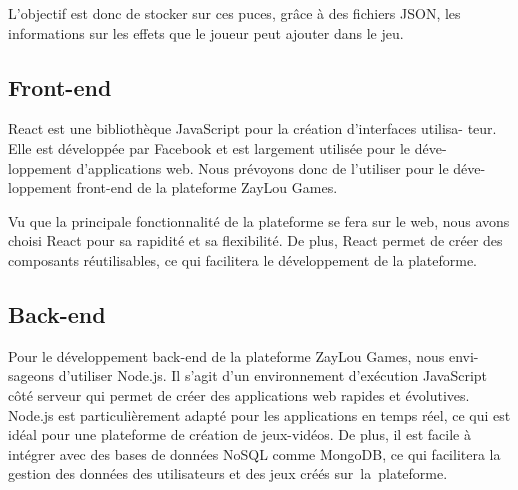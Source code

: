 \documentclass{article}             %
\begin{document}
L'objectif est donc de stocker sur ces puces, grâce à des fichiers JSON, les
informations sur les effets que le joueur peut ajouter dans le jeu.

\subsection{Front-end}
React est une bibliothèque JavaScript pour la création d'interfaces utilisa-
teur. Elle est développée par Facebook et est largement utilisée pour le déve-
loppement d'applications web. Nous prévoyons donc de l'utiliser pour le déve-
loppement front-end de la plateforme ZayLou Games.

Vu que la principale fonctionnalité de la plateforme se fera sur le web, nous
avons choisi React pour sa rapidité et sa flexibilité. De plus, React permet
de créer des composants réutilisables, ce qui facilitera le développement de la
plateforme.

\subsection{Back-end}
Pour le développement back-end de la plateforme ZayLou Games, nous envi-
sageons d'utiliser Node.js. Il s'agit d'un environnement d'exécution JavaScript
côté serveur qui permet de créer des applications web rapides et évolutives.
Node.js est particulièrement adapté pour les applications en temps réel, ce
qui est idéal pour une plateforme de création de jeux-vidéos. De plus, il est facile
à intégrer avec des bases de données NoSQL comme MongoDB, ce qui facilitera
la gestion des données des utilisateurs et des jeux créés sur la plateforme.
\end{document}
